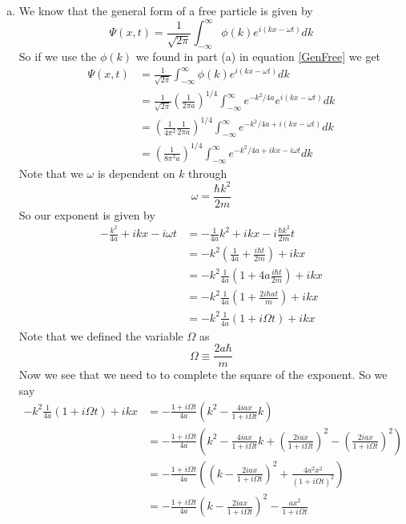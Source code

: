 \documentclass[11pt]{article}
\numberwithin{equation}{section}
\begin{document}
\begin{enumerate}[(a)]
\item
We know that the general form of a free particle is given by
\begin{equation}
\Psi(x,t) = \frac{1}{\sqrt{2\pi}}\int_{-\infty}^{\infty} \phi(k)e^{i(kx-\omega t)}dk
\label{GenFree}
\end{equation}
So if we use the $\phi(k)$ we found in part (a) in equation \ref{GenFree} we get
\begin{align*}
\Psi(x,t) &= \frac{1}{\sqrt{2\pi}}\int_{-\infty}^{\infty} \phi(k)e^{i(kx-\omega t)}dk\\
&= \frac{1}{\sqrt{2\pi}}\left(\frac{1}{2\pi a}\right)^{1/4}\int_{-\infty}^{\infty} e^{-{k^2}/{4a}}e^{i(kx-\omega t)}dk\\
&= \left(\frac{1}{4\pi^2}\frac{1}{2\pi a}\right)^{1/4}\int_{-\infty}^{\infty} e^{-{k^2}/{4a}+i(kx-\omega t)}dk\\
&= \left(\frac{1}{8\pi^3a}\right)^{1/4}\int_{-\infty}^{\infty} e^{-{k^2}/{4a}+ikx-i\omega t}dk
\end{align*}
Note that we $\omega$ is dependent on $k$ through
$$\omega = \frac{\hbar k^2}{2m}$$
So our exponent is given by
\begin{align*}
-\frac{k^2}{4a}+ikx-i\omega t &= -\frac{1}{4a}k^2 + ikx -i\frac{\hbar k^2}{2m}t\\
&= -k^2\left(\frac{1}{4a} + \frac{i\hbar t}{2m}\right) +ikx\\
&= -k^2\frac{1}{4a}\left(1 + 4a\frac{i\hbar t}{2m}\right) +ikx\\
&= -k^2\frac{1}{4a}\left(1 + \frac{2i\hbar at}{m}\right) +ikx\\
&= -k^2\frac{1}{4a}\left(1 + i\Omega t\right) +ikx
\end{align*}
Note that we defined the variable $\Omega$ as
$$\Omega\equiv\frac{2a\hbar}{m}$$
Now we see that we need to to complete the square of the exponent. So we say
\begin{align*}
-k^2\frac{1}{4a}\left(1 + i\Omega t\right) +ikx &= -\frac{1 + i\Omega t}{4a}\left(k^2 - \frac{4iax}{1+i\Omega t}k\right)\\
&= -\frac{1 + i\Omega t}{4a}\left(k^2 - \frac{4iax}{1+i\Omega t}k + \left(\frac{2iax}{1+i\Omega t}\right)^2 - \left(\frac{2iax}{1+i\Omega t}\right)^2\right)\\
&= -\frac{1 + i\Omega t}{4a}\left(\left(k-\frac{2iax}{1+i\Omega t}\right)^2 + \frac{4a^2x^2}{(1+i\Omega t)^2}\right)\\
&= -\frac{1 + i\Omega t}{4a}\left(k-\frac{2iax}{1+i\Omega t}\right)^2 - \frac{ax^2}{1+i\Omega t}\\

\end{align*}
\end{enumerate}
\end{document}
